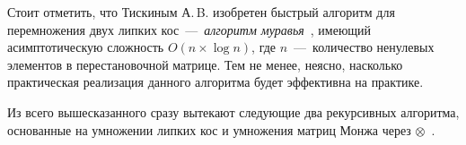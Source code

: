Стоит отметить, что Тискиным А.\,B. изобретен быстрый алгоритм для перемножения двух липких кос~---~\emph{алгоритм муравья}~\cite{tiskin2015fast}, имеющий асимптотическую сложность $O(n \times \log n)$, где $n$~---~количество ненулевых элементов в перестановочной матрице.
Тем не менее, 
неясно, насколько практическая реализация данного алгоритма будет эффективна на практике.

 Из всего вышесказанного сразу вытекают следующие два рекурсивных алгоритма, основанные на умножении липких кос и
умножения матриц Монжа через $\otimes$~\cite{tiskin2008semi}.


